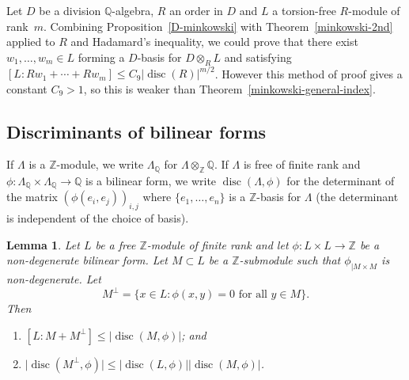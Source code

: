 \documentclass[JEP,XML,SOM,Unicode,NoFloatCountersInSection]{cedram}
\newenvironment{enumeratei}
{\bgroup\def\theenumi{\roman{enumi}}\def\theenumii{\alph{enumii}}\begin{enumerate}}
{\end{enumerate}\egroup}
\newcommand{\bQ}{\mathbb{Q}}
\newcommand{\bZ}{\mathbb{Z}}
\DeclareMathOperator{\disc}{disc}
\newcommand{\abs}[1]{\lvert #1 \rvert}
\newtheorem{lemma}{Lemma}[section]
\begin{document}
Let $D$ be a division $\bQ$-algebra, $R$ an order in $D$ and $L$ a torsion-free $R$-module of rank~$m$.
Combining Proposition~\ref{D-minkowski} with Theorem~\ref{minkowski-2nd} applied to $R$ and Hadamard's inequality, we could prove that there exist $w_1, \dotsc, w_m \in L$ forming a $D$-basis for $D \otimes_R L$ and satisfying $[L : Rw_1 + \dotsb + Rw_m] \leq C_{9} \abs{\disc(R)}^{m/2}$.
However this method of proof gives a constant $C_{9} > 1$, so this is weaker than Theorem~\ref{minkowski-general-index}.

\subsection{Discriminants of bilinear forms}

If $\Lambda$ is a $\bZ$-module, we write $\Lambda_\bQ$ for $\Lambda\otimes_\bZ\bQ$. If $\Lambda$ is free of finite rank and $\phi \colon \Lambda_\bQ \times \Lambda_\bQ \to \bQ$ is a bilinear form, we write $\disc(\Lambda,\phi)$ for the determinant of the matrix $(\phi(e_i,e_j))_{i,j}$ where $\{e_1,\ldots,e_n\}$ is a $\bZ$-basis for $\Lambda$ (the determinant is independent of the choice of basis).

\begin{lemma} \label{disc-lattice-complement}
Let $L$ be a free $\bZ$-module of finite rank and let $\phi \colon L \times L \to \bZ$ be a non-degenerate bilinear form.
Let $M \subset L$ be a $\bZ$-submodule such that $\phi_{|M \times M}$ is non-degenerate.
Let
\[
M^\perp = \{ x \in L : \phi(x,y) = 0 \text{ for all } y \in M \}.
\]
Then
\begin{enumeratei}
\item\label{disc-lattice-complementi} $[L : M + M^\perp] \leq \abs{\disc(M, \phi)}$; and
\item\label{disc-lattice-complementii} $\abs{\disc(M^\perp, \phi)} \leq \abs{\disc(L, \phi)} \abs{\disc(M, \phi)}$.
\end{enumeratei}
\end{lemma}
\end{document}
